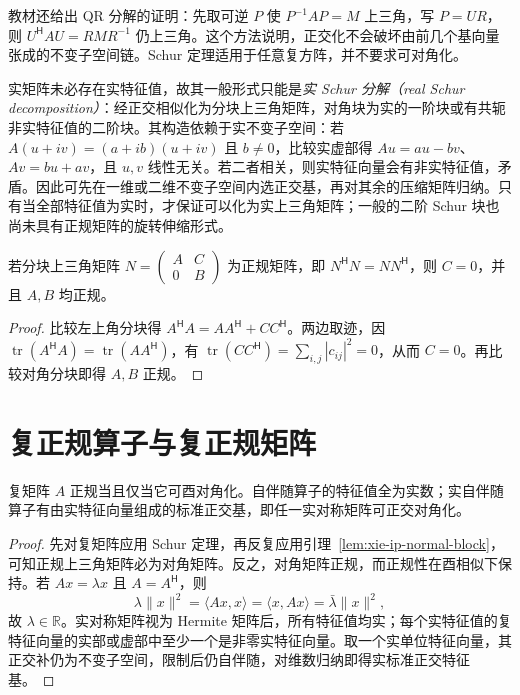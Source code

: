 教材还给出 QR 分解的证明：先取可逆 $P$ 使 $P^{-1}AP=M$ 上三角，写 $P=UR$，则 $U^{\mathsf H}AU=RMR^{-1}$ 仍上三角。这个方法说明，正交化不会破坏由前几个基向量张成的不变子空间链。Schur 定理适用于任意复方阵，并不要求可对角化。

实矩阵未必存在实特征值，故其一般形式只能是\emph{实 Schur 分解（real Schur decomposition）}：经正交相似化为分块上三角矩阵，对角块为实的一阶块或有共轭非实特征值的二阶块。其构造依赖于实不变子空间：若 $A(u+iv)=(a+ib)(u+iv)$ 且 $b\ne0$，比较实虚部得 $Au=au-bv$、$Av=bu+av$，且 $u,v$ 线性无关。若二者相关，则实特征向量会有非实特征值，矛盾。因此可先在一维或二维不变子空间内选正交基，再对其余的压缩矩阵归纳。只有当全部特征值为实时，才保证可以化为实上三角矩阵；一般的二阶 Schur 块也尚未具有正规矩阵的旋转伸缩形式。

\begin{lemma}
\label{lem:xie-ip-normal-block}
若分块上三角矩阵 $N=\begin{pmatrix}A&C\\0&B\end{pmatrix}$ 为正规矩阵，即 $N^{\mathsf H}N=NN^{\mathsf H}$，则 $C=0$，并且 $A,B$ 均正规。
\end{lemma}
\begin{proof}
比较左上角分块得 $A^{\mathsf H}A=AA^{\mathsf H}+CC^{\mathsf H}$。两边取迹，因 $\operatorname{tr}(A^{\mathsf H}A)=\operatorname{tr}(AA^{\mathsf H})$，有 $\operatorname{tr}(CC^{\mathsf H})=\sum_{i,j}|c_{ij}|^2=0$，从而 $C=0$。再比较对角分块即得 $A,B$ 正规。
\end{proof}

\section{复正规算子与复正规矩阵}
\label{sec:xie-ip-complex-normal}



\begin{theorem}
\label{thm:xie-ip-spectral-normal}
复矩阵 $A$ 正规当且仅当它可酉对角化。自伴随算子的特征值全为实数；实自伴随算子有由实特征向量组成的标准正交基，即任一实对称矩阵可正交对角化。
\end{theorem}
\begin{proof}
先对复矩阵应用 Schur 定理，再反复应用引理~\ref{lem:xie-ip-normal-block}，可知正规上三角矩阵必为对角矩阵。反之，对角矩阵正规，而正规性在酉相似下保持。若 $Ax=\lambda x$ 且 $A=A^{\mathsf H}$，则
\[
\lambda\|x\|^2=\langle Ax,x\rangle
=\langle x,Ax\rangle=\bar\lambda\|x\|^2,
\]
故 $\lambda\in\mathbb R$。实对称矩阵视为 Hermite 矩阵后，所有特征值均实；每个实特征值的复特征向量的实部或虚部中至少一个是非零实特征向量。取一个实单位特征向量，其正交补仍为不变子空间，限制后仍自伴随，对维数归纳即得实标准正交特征基。
\end{proof}

